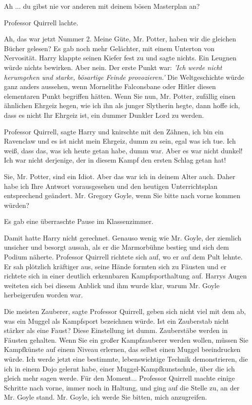 \glqq Ah ... du gibst nie vor anderen mit deinem bösen Masterplan an?\grqq{}

Professor Quirrell lachte.

\glqq Ah, das war jetzt Nummer 2. Meine Güte, Mr. Potter, haben wir die gleichen
Bücher gelesen?\grqq{} Es gab noch mehr Gelächter, mit einem Unterton von
Nervosität. Harry klappte seinen Kiefer fest zu und sagte nichts. Ein Leugnen
würde nichts bewirken. \glqq Aber nein. Der erste Punkt war: \emph{'Ich werde
nicht herumgehen und starke, bösartige Feinde provozieren.'} Die Weltgeschichte
würde ganz anders aussehen, wenn Mornelithe Falconsbane oder Hitler diesen
elementaren Punkt begriffen hätten. Wenn Sie nun, Mr. Potter, zufällig einen
ähnlichen Ehrgeiz hegen, wie ich ihn als junger Slytherin hegte, dann hoffe ich,
dass es nicht Ihr Ehrgeiz ist, ein dummer Dunkler Lord zu werden.\grqq{}

\glqq Professor Quirrell\grqq{}, sagte Harry und knirschte mit den Zähnen, \glqq
ich bin ein Ravenclaw und es ist nicht mein Ehrgeiz, dumm zu sein, egal was ich
tue. Ich weiß, dass das, was ich heute getan habe, dumm war. Aber es war nicht
dunkel! Ich war nicht derjenige, der in diesem Kampf den ersten Schlag getan
hat!\grqq{}

\glqq Sie, Mr. Potter, sind ein Idiot. Aber das war ich in deinem Alter auch.
Daher habe ich Ihre Antwort vorausgesehen und den heutigen Unterrichtsplan
entsprechend geändert. Mr. Gregory Goyle, wenn Sie bitte nach vorne kommen
würden?\grqq{}

Es gab eine überraschte Pause im Klassenzimmer.

Damit hatte Harry nicht gerechnet. Genauso wenig wie Mr. Goyle, der ziemlich
unsicher und besorgt aussah, als er die Marmorbühne bestieg und sich dem Podium
näherte. Professor Quirrell richtete sich auf, wo er auf dem Pult lehnte. Er sah
plötzlich kräftiger aus, seine Hände formten sich zu Fäusten und er richtete
sich in einer deutlich erkennbaren Kampfsporthaltung auf. Harrys Augen weiteten
sich bei diesem Anblick und ihm wurde klar, warum Mr. Goyle herbeigerufen worden
war.

\glqq Die meisten Zauberer\grqq{}, sagte Professor Quirrell, \glqq geben sich
nicht viel mit dem ab, was ein Muggel als Kampfsport bezeichnen würde. Ist ein
Zauberstab nicht stärker als eine Faust? Diese Einstellung ist dumm. Zauberstäbe
werden in Fäusten gehalten. Wenn Sie ein großer Kampfzauberer werden wollen,
müssen Sie Kampfkünste auf einem Niveau erlernen, das selbst einen Muggel
beeindrucken würde. Ich werde jetzt eine bestimmte, lebenswichtige Technik
demonstrieren, die ich in einem Dojo gelernt habe, einer
Muggel-Kampfkunstschule, über die ich gleich mehr sagen werde. Für den
Moment...\grqq{} Professor Quirrell machte einige Schritte nach vorne, immer
noch in Haltung, und ging auf die Stelle zu, an der Mr. Goyle stand. \glqq Mr.
Goyle, ich werde Sie bitten, mich anzugreifen.\grqq{}

